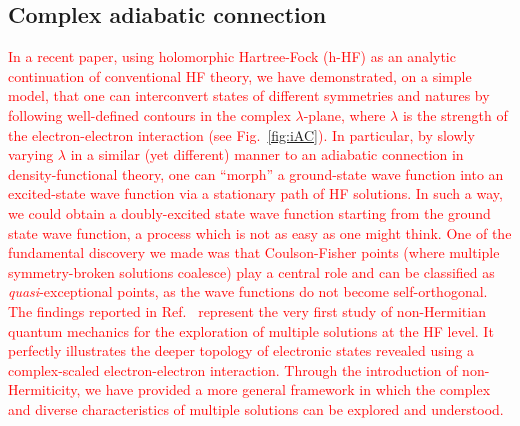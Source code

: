\documentclass[aps,prb,reprint,noshowkeys,superscriptaddress]{revtex4-1}
\newcommand{\titou}[1]{\textcolor{red}{#1}}
\begin{document}
\subsection{Complex adiabatic connection}

\titou{In a recent paper, \cite{Burton_2019} using holomorphic Hartree-Fock (h-HF) \cite{Hiscock_2014,Burton_2018,Burton_2016} as an analytic continuation of conventional HF theory, we have demonstrated, on a simple model, that one can interconvert states of different symmetries and natures by following well-defined contours in the complex $\lambda$-plane, where $\lambda$ is the strength of the electron-electron interaction (see Fig.~\ref{fig:iAC}).
In particular, by slowly varying $\lambda$ in a similar (yet different) manner to an adiabatic connection in density-functional theory, \cite{Langreth_1975,Gunnarsson_1976,Zhang_2004} one can ``morph'' a ground-state wave function into an excited-state wave function via a stationary path of HF solutions. \cite{Seidl_2018}
In such a way, we could obtain a doubly-excited state wave function starting from the ground state wave function, a process which is not as easy as one might think. \cite{Gilbert_2008,Thom_2008,Shea_2018}
One of the fundamental discovery we made was that Coulson-Fisher points (where multiple symmetry-broken solutions coalesce) play a central role and can be classified as \textit{quasi}-exceptional points, as the wave functions do not become self-orthogonal.
The findings reported in Ref.~\onlinecite{Burton_2019} represent the very first study of non-Hermitian quantum mechanics for the exploration of multiple solutions at the HF level. 
It perfectly illustrates the deeper topology of electronic states revealed using a complex-scaled electron-electron interaction.
Through the introduction of non-Hermiticity, we have provided a more general framework in which the complex and diverse characteristics of multiple solutions can be explored and understood.}
\end{document}
